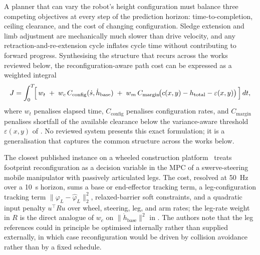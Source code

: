 \documentclass[11pt,a4paper]{article}
\begin{document}
A planner that can vary the robot's height configuration must balance three competing objectives at every step of the prediction horizon: time-to-completion, ceiling clearance, and the cost of changing configuration. Sledge extension and limb adjustment are mechanically much slower than drive velocity, and any retraction-and-re-extension cycle inflates cycle time without contributing to forward progress. Synthesising the structure that recurs across the works reviewed below, the reconfiguration-aware path cost can be expressed as a weighted integral
\begin{equation}
J = \int_0^T \!\Bigl[\, w_t \;+\; w_c\, C_{\text{config}}(\dot{s}, \dot{h}_{\text{base}}) \;+\; w_m\, C_{\text{margin}}\!\bigl(c(x,y) - h_{\text{total}} - \varepsilon(x,y)\bigr) \,\Bigr]\, dt,
\label{eq:reconfig_cost}
\end{equation}
where $w_t$ penalises elapsed time, $C_{\text{config}}$ penalises configuration rates, and $C_{\text{margin}}$ penalises shortfall of the available clearance below the variance-aware threshold $\varepsilon(x,y)$ of . No reviewed system presents this exact formulation; it is a generalisation that captures the common structure across the works below.

The closest published instance on a wheeled construction platform~\parencite{pankertDesignMotionPlanning2022} treats footprint reconfiguration as a decision variable in the MPC of a swerve-steering mobile manipulator with passively articulated legs. The cost, resolved at \SI{50}{\hertz} over a \SI{10}{\second} horizon, sums a base or end-effector tracking term, a leg-configuration tracking term $\lVert \varphi_L - \hat{\varphi}_L \rVert_2^2$, relaxed-barrier soft constraints, and a quadratic input penalty $u^\top R u$ over wheel, steering, leg, and arm rates; the leg-rate weight in $R$ is the direct analogue of $w_c$ on $\lVert \dot{h}_{\text{base}} \rVert^2$ in . The authors note that the leg references could in principle be optimised internally rather than supplied externally, in which case reconfiguration would be driven by collision avoidance rather than by a fixed schedule.
\end{document}
